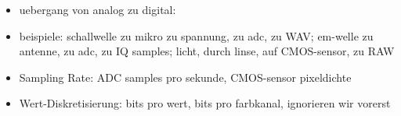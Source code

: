 \begin{itemize}
    \item uebergang von analog zu digital: 
    \item beispiele: schallwelle zu mikro zu spannung, zu adc, zu WAV; em-welle zu antenne, zu adc, zu IQ samples; licht, durch linse, auf CMOS-sensor, zu RAW
    \item Sampling Rate: ADC samples pro sekunde, CMOS-sensor pixeldichte
    \item Wert-Diskretisierung: bits pro wert, bits pro farbkanal, ignorieren wir vorerst
\end{itemize}